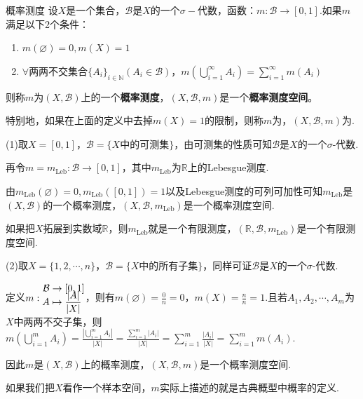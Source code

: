 \begin{definition}{概率测度}
    \wideline
    设$X$是一个集合，$\mathcal{B}$是$X$的一个$\sigma-\text{代数}$，函数：$m:\mathcal{B}\rightarrow[0,1]$.如果$m$满足以下2个条件：

    \begin{enumerate}
        \item $m(\varnothing)=0,m(X)=1$
        \item $\forall$两两不交集合$\{A_i\}_{i\in\mathbb{N}}(A_i\in\mathcal{B})$，$m\left(\bigcup_{i=1}^{\infty}{A_i}\right)=\sum_{i=1}^{\infty}{m(A_i)}$
    \end{enumerate}
    则称$m$为$(X,\mathcal{B})$上的一个\textbf{概率测度}，$(X,\mathcal{B},m)$是一个\textbf{概率测度空间}。
\end{definition}
特别地，如果在上面的定义中去掉$m(X)=1$的限制，则称$m$为，$(X,\mathcal{B},m)$为.

\begin{instance}
    (1)取$X=[0,1]$，$\mathcal{B}=\{X\text{中的可测集}\}$，由可测集的性质可知$\mathcal{B}$是$X$的一个$\sigma$-代数.\par

    再令$m=m_{\mathrm{Leb}}:\mathcal{B}\rightarrow [0,1]$，其中$m_{\mathrm{Leb}}$为$\mathbb{R}$上的Lebesgue测度.\par
    由$m_{\mathrm{Leb}}(\varnothing)=0,m_{\mathrm{Leb}}([0,1])=1$以及Lebesgue测度的可列可加性可知$m_{\mathrm{Leb}}$是$(X,\mathcal{B})$的一个概率测度，$(X,\mathcal{B},m_{\mathrm{Leb}})$是一个概率测度空间.\par
    如果把$X$拓展到实数域$\mathbb{R}$，则$m_{\mathrm{Leb}}$就是一个有限测度，$(\mathbb{R},\mathcal{B},m_{\mathrm{Leb}})$是一个有限测度空间.\par
    (2)取$X=\{1,2,\cdots,n\}$，$\mathcal{B}=\{X\text{中的所有子集}\}$，同样可证$\mathcal{B}$是$X$的一个$\sigma$-代数.\par
    定义$m:{\setlength{\jot}{-0.5em}\begin{aligned}
        \mathcal{B}&\to [0,1]\\
        A&\mapsto \frac{|A|}{|X|}
    \end{aligned}}$，则有$m(\varnothing)=\frac{0}{n}=0$，$m(X)=\frac{n}{n}=1$.且若$A_1,A_2,\cdots,A_m$为$X$中两两不交子集，则$m\left(\bigcup_{i=1}^m{A_i}\right)=\frac{\left|\displaystyle\bigcup_{i=1}^m{A_i}\right|}{|X|}=\frac{\displaystyle\sum_{i=1}^m{|A_i|}}{|X|}=\sum_{i=1}^m{\frac{|A_i|}{|X|}}=\sum_{i=1}^m{m(A_i)}$.\par
    因此$m$是$(X,\mathcal{B})$上的概率测度，$(X,\mathcal{B},m)$是一个概率测度空间.\par
    如果我们把$X$看作一个样本空间，$m$实际上描述的就是古典概型中概率的定义.
\end{instance}

